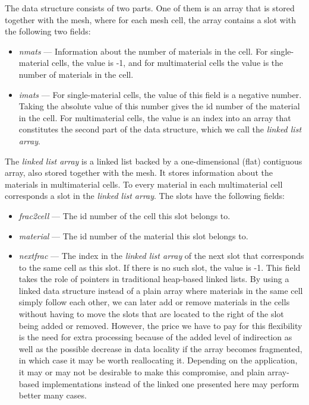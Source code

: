 \documentclass[fontsize=11pt, appendixprefix=true]{scrreprt}
\begin{document}
The data structure consists of two parts. One of them is an array that is stored
together with the mesh, where for each mesh cell, the array contains a slot with
the following two fields:

\begin{itemize}
  \item \textit{nmats} --- Information about the number of materials in the
    cell. For single-material cells, the value is -1, and for multimaterial
    cells the value is the number of materials in the cell.
  \item \textit{imats} --- For single-material cells, the value of this field is
    a negative number. Taking the absolute value of this number gives the id
    number of the material in the cell. For multimaterial cells, the value is an
    index into an array that constitutes the second part of the data
    structure, which we call the \textit{linked list array}.
\end{itemize}

The \textit{linked list array} is a linked list backed by a one-dimensional
(flat) contiguous array, also stored together with the mesh. It stores
information about the materials in multimaterial cells. To every material in
each multimaterial cell corresponds a slot in the \textit{linked list
  array}. The slots have the following fields:

\begin{itemize}
  \item \textit{frac2cell} --- The id number of the cell this slot belongs
    to.
  \item \textit{material} --- The id number of the material this slot belongs
    to.
  \item \textit{nextfrac} --- The index in the \textit{linked list array} of the
    next slot that corresponds to the same cell as this slot. If there is no
    such slot, the value is -1. This field takes the role of pointers in
    traditional heap-based linked lists. By using a linked data structure
    instead of a plain array where materials in the same cell simply follow each
    other, we can later add or remove materials in the cells without having to
    move the slots that are located to the right of the slot being added or
    removed. However, the price we have to pay for this flexibility is the need
    for extra processing because of the added level of indirection as well as
    the possible decrease in data locality if the array becomes fragmented, in
    which case it may be worth reallocating it. Depending on the application, it
    may or may not be desirable to make this compromise, and plain array-based
    implementations instead of the linked one presented here may perform better
    many cases.
\end{itemize}
\end{document}
